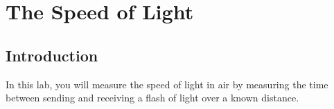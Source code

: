 \chapter{The Speed of Light}

%
%
%
%


\section{Introduction}

In this lab, you will measure the speed of light in air by measuring
the time between sending and receiving a flash of light over a known
distance. 

